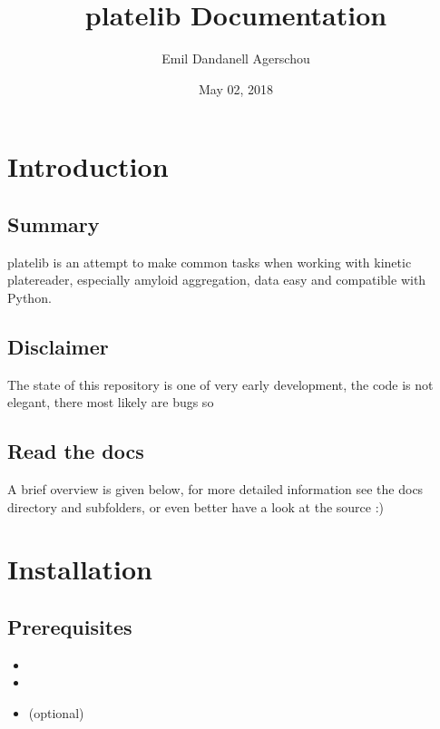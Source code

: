 \documentclass[letterpaper,10pt,english]{sphinxmanual}
\title{platelib Documentation}
\date{May 02, 2018}
\author{Emil Dandanell Agerschou}
\begin{document}
\maketitle
\sphinxtableofcontents
{}\label{\detokenize{index::doc}}



\chapter{Introduction}
\label{\detokenize{introduction:introduction}}\label{\detokenize{introduction::doc}}\label{\detokenize{introduction:welcome-to-the-platelib-documentation}}

\section{Summary}
\label{\detokenize{introduction:summary}}
platelib is an attempt to make common tasks when working
with kinetic platereader, especially amyloid aggregation,
data easy and compatible with Python.


\section{Disclaimer}
\label{\detokenize{introduction:disclaimer}}
The state of this repository is one of very early development,
the code is not elegant, there most likely are bugs so


\section{Read the docs}
\label{\detokenize{introduction:read-the-docs}}
A brief overview is given below, for more detailed information
see the docs directory and subfolders,
or even better have a look at the source :)


\chapter{Installation}
\label{\detokenize{install:installation}}\label{\detokenize{install::doc}}

\section{Prerequisites}
\label{\detokenize{install:prerequisites}}\begin{itemize}
\item {} 

\item {} 

\item {} 
 (optional)

\end{itemize}
\end{document}
